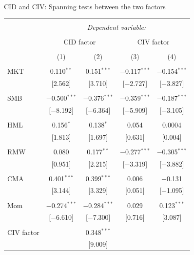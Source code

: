 \documentclass{beamer}
\begin{document}
\scriptsize
{\renewcommand{\arraystretch}{0.56}
\begin{frame}{CID and CIV: Spanning tests between the two factors}
\vspace{-0.3cm}
\begin{table}[!htbp] \centering 
\begin{tabular}{@{\extracolsep{5pt}}lcccc} 
\\[-1ex]\hline 
\hline \\[-1.8ex] 
 & \multicolumn{4}{c}{\textit{Dependent variable:}} \\ 
\cline{2-5} 
\\[-1ex] & \multicolumn{2}{c}{CID factor} & \multicolumn{2}{c}{CIV factor} \\ 
\\[-1.8ex] & (1) & (2) & (3) & (4)\\ 
\hline \\[-1ex] 
 MKT & 0.110$^{**}$ & 0.151$^{***}$ & $-$0.117$^{***}$ & $-$0.154$^{***}$ \\ 
  & [2.562] & [3.710] & [$-$2.727] & [$-$3.827] \\ 
  & & & & \\ 
 SMB & $-$0.500$^{***}$ & $-$0.376$^{***}$ & $-$0.359$^{***}$ & $-$0.187$^{***}$ \\ 
  & [$-$8.192] & [$-$6.364] & [$-$5.909] & [$-$3.105] \\ 
  & & & & \\ 
 HML & 0.156$^{*}$ & 0.138$^{*}$ & 0.054 & 0.0004 \\ 
  & [1.813] & [1.697] & [0.631] & [0.004] \\ 
  & & & & \\ 
 RMW & 0.080 & 0.177$^{**}$ & $-$0.277$^{***}$ & $-$0.305$^{***}$ \\ 
  & [0.951] & [2.215] & [$-$3.319] & [$-$3.882] \\ 
  & & & & \\ 
 CMA & 0.401$^{***}$ & 0.399$^{***}$ & 0.006 & $-$0.131 \\ 
  & [3.144] & [3.329] & [0.051] & [$-$1.095] \\ 
  & & & & \\ 
 Mom & $-$0.274$^{***}$ & $-$0.284$^{***}$ & 0.029 & 0.123$^{***}$ \\ 
  & [$-$6.610] & [$-$7.300] & [0.716] & [3.087] \\ 
  & & & & \\ 
 CIV factor &  & 0.348$^{***}$ &  &  \\ 
  &  & [9.009] &  &  \\ 

\end{tabular}
\end{table}
\end{frame}}
\end{document}
